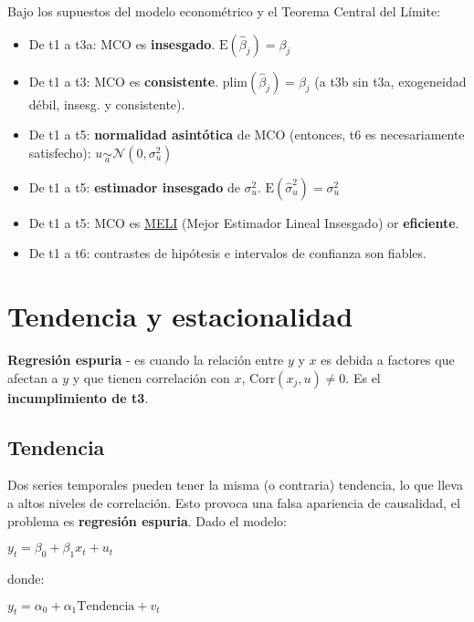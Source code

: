 \documentclass[10pt, a4paper, landscape]{extarticle}
\newcommand{\E}{\mathrm{E}}
\newcommand{\Corr}{\mathrm{Corr}}
\begin{document}
\begin{multicols}{3}
Bajo los supuestos del modelo econométrico y el Teorema Central del Límite:

\begin{itemize}[leftmargin=*]
	\item De t1 a t3a: MCO es \textbf{insesgado}. $\E(\hat{\beta}_j) = \beta_j$
	\item De t1 a t3: MCO es \textbf{consistente}. $\mathrm{plim}(\hat{\beta}_j) = \beta_j$ (a t3b sin t3a, exogeneidad débil, insesg. y consistente).
	\item De t1 a t5: \textbf{normalidad asintótica} de MCO (entonces, t6 es necesariamente satisfecho): $u \underset{a}{\sim} \mathcal{N}(0, \sigma^2_u)$
	\item De t1 a t5: \textbf{estimador insesgado} de $\sigma^2_u$. $\E(\hat{\sigma}^2_u) = \sigma^2_u$
	\item De t1 a t5: MCO es \textcolor{blue}{\href{https://www.youtube.com/watch?v=68ugkg9RePc}{MELI}} (Mejor Estimador Lineal Insesgado) or \textbf{eficiente}. 
	\item De t1 a t6: contrastes de hipótesis e intervalos de confianza son fiables.
\end{itemize}

\columnbreak

\section*{Tendencia y estacionalidad}

\textbf{Regresión espuria} - es cuando la relación entre $y$ y $x$ es debida a factores que afectan a $y$ y que tienen correlación con $x$, $\Corr(x_j, u) \neq 0$. Es el \textbf{incumplimiento de t3}.

\subsection*{Tendencia}

Dos series temporales pueden tener la misma (o contraria) tendencia, lo que lleva a altos niveles de correlación. Esto provoca una falsa apariencia de causalidad, el problema es \textbf{regresión espuria}. Dado el modelo:

\begin{center}
	$y_t = \beta_0 + \beta_1 x_t + u_t$
\end{center}

donde:

\begin{center}
	$y_t = \alpha_0 + \alpha_1 \mathrm{Tendencia} + v_t$


\end{center}
\end{multicols}
\end{document}
